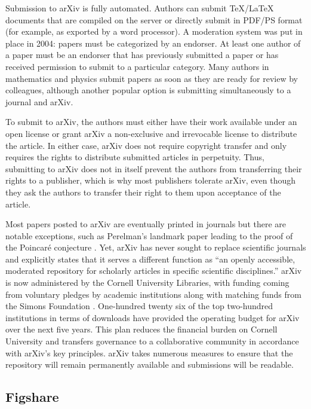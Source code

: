 \documentclass[letterpaper,twocolumn,superscriptaddress,showkeys]{revtex4-1}
\begin{document}
Submission to arXiv is fully automated.  Authors can submit \TeX{}/\LaTeX{}
documents that are compiled on the server or directly submit in PDF/PS format
(for example, as exported by a word processor).  A moderation system was put in
place in 2004: papers must be categorized by an endorser. At least one
author of a paper must be an endorser that has previously submitted a paper or
has received permission to submit to a particular category.  Many authors in
mathematics and physics submit papers as soon as they are ready for review by
colleagues, although another popular option is submitting simultaneously to a
journal and arXiv.

To submit to arXiv, the authors must either have their work available under an
open license or grant arXiv a non-exclusive and irrevocable license to
distribute the article. In either case, arXiv does not require copyright
transfer and only requires the rights to distribute submitted articles in
perpetuity. Thus, submitting to arXiv does not in itself prevent the authors
from transferring their rights to a publisher, which is why most publishers
tolerate arXiv, even though they ask the authors to transfer their right to them
upon acceptance of the article. 

Most papers posted to arXiv are eventually printed in journals but
there are notable exceptions, such as Perelman's landmark paper
leading to the proof of the Poincar\'{e} conjecture
\cite{2002math.....11159P}. Yet, arXiv has never sought to replace
scientific journals and explicitly states that it serves a different
function as ``an openly accessible, moderated repository for scholarly
articles in specific scientific disciplines.'' arXiv is now
administered by the Cornell University Libraries, with funding coming
from voluntary pledges by academic institutions along with matching
funds from the Simons Foundation \cite{arxiv_future}.  One-hundred
twenty six of the top two-hundred institutions in terms of downloads
have provided the operating budget for arXiv over the next five years.
This plan reduces the financial burden on Cornell University and
transfers governance to a collaborative community in accordance with
arXiv's key principles.  arXiv takes numerous measures to ensure that
the repository will remain permanently available and submissions will
be readable.

\subsection{Figshare}
\end{document}
